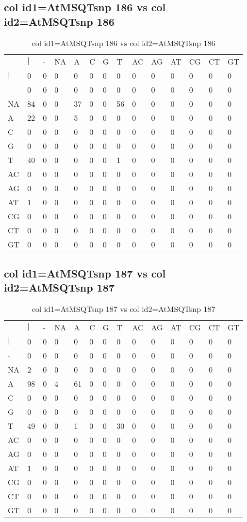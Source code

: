 \subsection{col id1=AtMSQTsnp 186 vs col id2=AtMSQTsnp 186}
\begin{center}
\begin{longtable}{|l|l|l|l|l|l|l|l|l|l|l|l|l|l|}
\caption{col id1=AtMSQTsnp 186 vs col id2=AtMSQTsnp 186} \label{table_dm562}\\
\hline
\\
\hline
&$|$&-&NA&A&C&G&T&AC&AG&AT&CG&CT&GT\\
$|$&0&0&0&0&0&0&0&0&0&0&0&0&0\\
-&0&0&0&0&0&0&0&0&0&0&0&0&0\\
NA&84&0&0&37&0&0&56&0&0&0&0&0&0\\
A&22&0&0&5&0&0&0&0&0&0&0&0&0\\
C&0&0&0&0&0&0&0&0&0&0&0&0&0\\
G&0&0&0&0&0&0&0&0&0&0&0&0&0\\
T&40&0&0&0&0&0&1&0&0&0&0&0&0\\
AC&0&0&0&0&0&0&0&0&0&0&0&0&0\\
AG&0&0&0&0&0&0&0&0&0&0&0&0&0\\
AT&1&0&0&0&0&0&0&0&0&0&0&0&0\\
CG&0&0&0&0&0&0&0&0&0&0&0&0&0\\
CT&0&0&0&0&0&0&0&0&0&0&0&0&0\\
GT&0&0&0&0&0&0&0&0&0&0&0&0&0\\
\hline
\end{longtable}
\end{center}

\subsection{col id1=AtMSQTsnp 187 vs col id2=AtMSQTsnp 187}
\begin{center}
\begin{longtable}{|l|l|l|l|l|l|l|l|l|l|l|l|l|l|}
\caption{col id1=AtMSQTsnp 187 vs col id2=AtMSQTsnp 187} \label{table_dm564}\\
\hline
\\
\hline
&$|$&-&NA&A&C&G&T&AC&AG&AT&CG&CT&GT\\
$|$&0&0&0&0&0&0&0&0&0&0&0&0&0\\
-&0&0&0&0&0&0&0&0&0&0&0&0&0\\
NA&2&0&0&0&0&0&0&0&0&0&0&0&0\\
A&98&0&4&61&0&0&0&0&0&0&0&0&0\\
C&0&0&0&0&0&0&0&0&0&0&0&0&0\\
G&0&0&0&0&0&0&0&0&0&0&0&0&0\\
T&49&0&0&1&0&0&30&0&0&0&0&0&0\\
AC&0&0&0&0&0&0&0&0&0&0&0&0&0\\
AG&0&0&0&0&0&0&0&0&0&0&0&0&0\\
AT&1&0&0&0&0&0&0&0&0&0&0&0&0\\
CG&0&0&0&0&0&0&0&0&0&0&0&0&0\\
CT&0&0&0&0&0&0&0&0&0&0&0&0&0\\
GT&0&0&0&0&0&0&0&0&0&0&0&0&0\\
\hline
\end{longtable}
\end{center}

